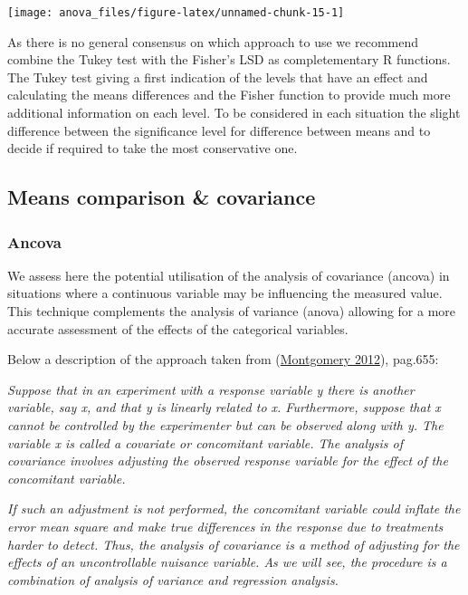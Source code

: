 \documentclass[
]{book}
\begin{document}
\texttt{[image: anova\_files/figure-latex/unnamed-chunk-15-1]}

As there is no general consensus on which approach to use we recommend combine the Tukey test with the Fisher's LSD as completementary R functions. The Tukey test giving a first indication of the levels that have an effect and calculating the means differences and the Fisher function to provide much more additional information on each level. To be considered in each situation the slight difference between the significance level for difference between means and to decide if required to take the most conservative one.

\hypertarget{means-comparison-covariance}{%
\subsection{Means comparison \& covariance}\label{means-comparison-covariance}}

\hypertarget{ancova}{%
\subsubsection{Ancova}\label{ancova}}

We assess here the potential utilisation of the analysis of covariance (ancova) in situations where a continuous variable may be influencing the measured value. This technique complements the analysis of variance (anova) allowing for a more accurate assessment of the effects of the categorical variables.

Below a description of the approach taken from (\protect\hyperlink{ref-Montgomery2012}{Montgomery 2012}), pag.655:

\emph{Suppose that in an experiment with a response variable y there is another variable, say x, and that y is linearly related to x. Furthermore, suppose that x cannot be controlled by the experimenter but can be observed along with y. The variable x is called a covariate or concomitant variable. The analysis of covariance involves adjusting the observed response variable for the effect of the concomitant variable.}

\emph{If such an adjustment is not performed, the concomitant variable could inflate the error mean square and make true differences in the response due to treatments harder to detect. Thus, the analysis of covariance is a method of adjusting for the effects of an uncontrollable nuisance variable. As we will see, the procedure is a combination of analysis of variance and regression analysis.}
\end{document}
